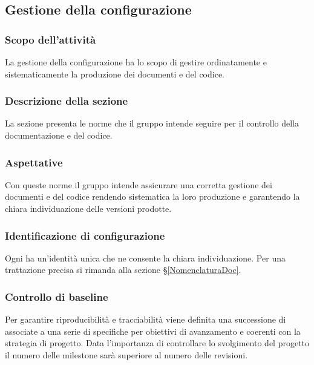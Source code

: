 \subsection{Gestione della configurazione}
\subsubsection{Scopo dell'attività} \label{PSup_GestioneConf_Scopo}
La gestione della configurazione ha lo scopo di gestire ordinatamente e sistematicamente la produzione dei documenti e del codice.

\subsubsection{Descrizione della sezione} 
La sezione presenta le norme che il gruppo intende seguire per il controllo della documentazione e del codice.

\subsubsection{Aspettative}
Con queste norme il gruppo intende assicurare una corretta gestione dei documenti e del codice rendendo sistematica la loro produzione e garantendo la chiara individuazione delle versioni prodotte.

\subsubsection{Identificazione di configurazione}
Ogni  ha un'identità unica che ne consente la chiara individuazione. Per una trattazione precisa si rimanda alla sezione \S\ref{NomenclaturaDoc}.

\subsubsection{Controllo di baseline}
Per garantire riproducibilità e tracciabilità viene definita una successione di  associate a una serie di  specifiche per obiettivi di avanzamento e coerenti con la strategia di progetto. Data l'importanza di controllare lo svolgimento del progetto il numero delle milestone sarà superiore al numero delle revisioni.

